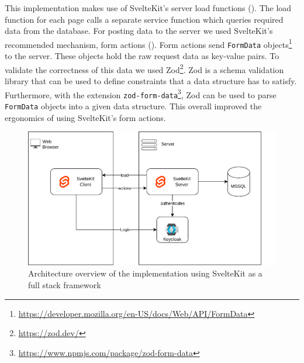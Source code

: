 This implementation makes use of SvelteKit's server load functions (). The load function for each page calls a separate service function which queries required data from the database. For posting data to the server we used SvelteKit's recommended mechanism, form actions (). Form actions send \texttt{FormData} objects\footnote{\url{https://developer.mozilla.org/en-US/docs/Web/API/FormData}} to the server. These objects hold the raw request data as key-value pairs. To validate the correctness of this data we used Zod\footnote{\url{https://zod.dev/}}. Zod is a schema validation library that can be used to define constraints that a data structure has to satisfy. Furthermore, with the extension \texttt{zod-form-data}\footnote{\url{https://www.npmjs.com/package/zod-form-data}}, Zod can be used to parse \texttt{FormData} objects into a given data structure. This overall improved the ergonomics of using SvelteKit's form actions.  


\begin{figure}
    \centering
    \includegraphics[width=.8\linewidth]{assets/dswfd-architecture-fullstack}
    \caption{Architecture overview of the implementation using SvelteKit as a full stack framework}
    \label{fig:dswfd-architecture-fullstack}
\end{figure}

